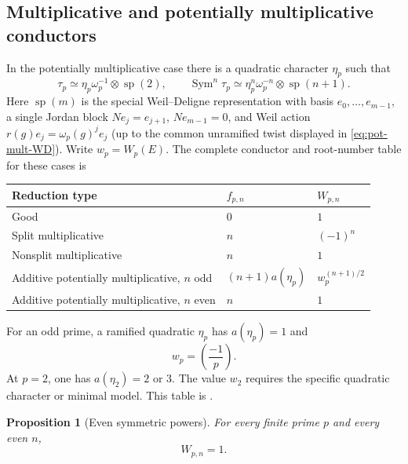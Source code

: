 \documentclass[11pt,reqno]{amsart}
\newtheorem{proposition}[theorem]{Proposition}
\theoremstyle{definition}
\theoremstyle{remark}
\newcommand{\Sym}{\operatorname{Sym}}
\newcommand{\spc}{\operatorname{sp}}
\begin{document}
\subsection{Multiplicative and potentially multiplicative conductors}

In the potentially multiplicative case there is a quadratic character
$\eta_p$ such that
\begin{equation}\label{eq:pot-mult-WD}
 \tau_p\simeq\eta_p\omega_p^{-1}\otimes\spc(2),
 \qquad
 \Sym^n\tau_p\simeq
 \eta_p^n\omega_p^{-n}\otimes\spc(n+1).
\end{equation}
Here $\spc(m)$ is the special Weil--Deligne representation with basis
$e_0,\ldots,e_{m-1}$, a single Jordan block
$Ne_j=e_{j+1}$, $Ne_{m-1}=0$, and Weil action
$r(g)e_j=\omega_p(g)^je_j$ (up to the common unramified twist displayed in
\eqref{eq:pot-mult-WD}).
Write $w_p=W_p(E)$.  The complete conductor and root-number table for these
cases is
\begin{center}
\renewcommand{\arraystretch}{1.2}
\begin{tabular}{@{}p{}p{}p{}@{}}
\toprule
Reduction type & $f_{p,n}$ & $W_{p,n}$ \\
\midrule
Good & $0$ & $1$ \\
Split multiplicative & $n$ & $(-1)^n$ \\
Nonsplit multiplicative & $n$ & $1$ \\
Additive potentially multiplicative, $n$ odd
& $(n+1)a(\eta_p)$ & $w_p^{(n+1)/2}$ \\
Additive potentially multiplicative, $n$ even
& $n$ & $1$ \\
\bottomrule
\end{tabular}
\end{center}
For an odd prime, a ramified quadratic $\eta_p$ has $a(\eta_p)=1$ and
\begin{equation*}
 w_p=\left(\frac{-1}{p}\right).
\end{equation*}
At $p=2$, one has $a(\eta_2)=2$ or $3$.  The value $w_2$ requires the
specific quadratic character or minimal model.
This table is \cite[Proposition~4.1]{DMW}.

\begin{proposition}[Even symmetric powers]\label{prop:even-root}
For every finite prime $p$ and every even $n$,
\begin{equation}\label{eq:even-root}
 W_{p,n}=1.
\end{equation}
\end{proposition}
\end{document}

